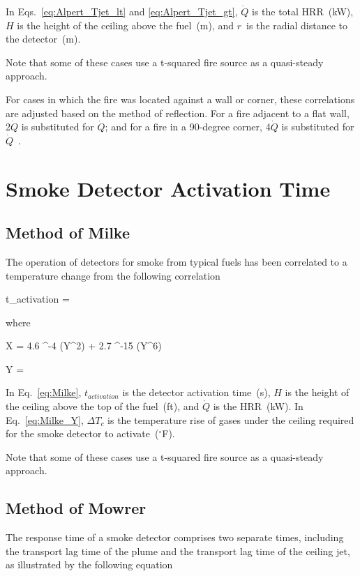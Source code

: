 In Eqs.~\ref{eq:Alpert_Tjet_lt} and \ref{eq:Alpert_Tjet_gt}, $\dot Q$ is the total HRR~(kW), $H$ is the height of the ceiling above the fuel~(m), and $r$~is the radial distance to the detector~(m).

Note that some of these cases use a t-squared fire source as a quasi-steady approach.

For cases in which the fire was located against a wall or corner, these correlations are adjusted based on the method of reflection. For a fire adjacent to a flat wall, 2$\dot Q$ is substituted for $\dot Q$; and for a fire in a 90-degree corner, 4$\dot Q$ is substituted for $\dot Q$~\cite{SFPE:Alpert}.


\clearpage


\section{Smoke Detector Activation Time}

\subsection{Method of Milke}

The operation of detectors for smoke from typical fuels has been correlated to a temperature change from the following correlation

\be
t_{activation} = 
\label{eq:Milke}
\ee

\noindent where

\be
X = 4.6 ^{-4} (Y^2) + 2.7 ^{-15} (Y^6)
\label{eq:Milke_X}
\ee

\be
Y = 
\label{eq:Milke_Y}
\ee

In Eq.~\ref{eq:Milke}, $t_{activation}$ is the detector activation time~(s), $H$ is the height of the ceiling above the top of the fuel~(ft), and $\dot Q$ is the HRR~(kW). In Eq.~\ref{eq:Milke_Y}, $\Delta T_c$ is the temperature rise of gases under the ceiling required for the smoke detector to activate~($^\circ$F).

Note that some of these cases use a t-squared fire source as a quasi-steady approach.


\clearpage


\subsection{Method of Mowrer}

The response time of a smoke detector comprises two separate times, including the transport lag time of the plume and the transport lag time of the ceiling jet, as illustrated by the following equation

